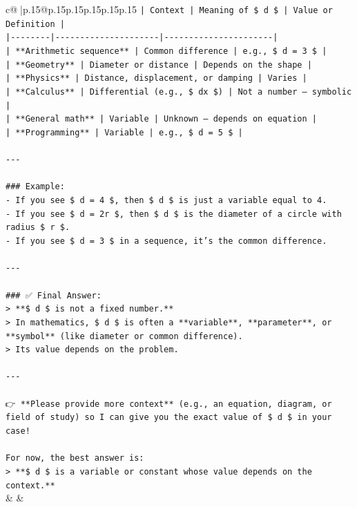 \documentclass{article}
\begin{document}
{\begin{supertabular}{c@{$\;$}|p{.15\linewidth}@{}p{.15\linewidth}p{.15\linewidth}p{.15\linewidth}p{.15\linewidth}p{.15\linewidth}}
{{{\texttt{| Context | Meaning of \$ d \$ | Value or Definition |} \\
\texttt{|{-}{-}{-}{-}{-}{-}{-}{-}|{-}{-}{-}{-}{-}{-}{-}{-}{-}{-}{-}{-}{-}{-}{-}{-}{-}{-}{-}{-}{-}|{-}{-}{-}{-}{-}{-}{-}{-}{-}{-}{-}{-}{-}{-}{-}{-}{-}{-}{-}{-}{-}{-}|} \\
\texttt{| **Arithmetic sequence** | Common difference | e.g., \$ d = 3 \$ |} \\
\texttt{| **Geometry** | Diameter or distance | Depends on the shape |} \\
\texttt{| **Physics** | Distance, displacement, or damping | Varies |} \\
\texttt{| **Calculus** | Differential (e.g., \$ dx \$) | Not a number — symbolic |} \\
\texttt{| **General math** | Variable | Unknown — depends on equation |} \\
\texttt{| **Programming** | Variable | e.g., \$ d = 5 \$ |} \\
\\ 
\texttt{{-}{-}{-}} \\
\\ 
\texttt{\#\#\# Example:} \\
\texttt{{-} If you see \$ d = 4 \$, then \$ d \$ is just a variable equal to 4.} \\
\texttt{{-} If you see \$ d = 2r \$, then \$ d \$ is the diameter of a circle with radius \$ r \$.} \\
\texttt{{-} If you see \$ d = 3 \$ in a sequence, it's the common difference.} \\
\\ 
\texttt{{-}{-}{-}} \\
\\ 
\texttt{\#\#\# ✅ Final Answer:} \\
\texttt{> **\$ d \$ is not a fixed number.**  } \\
\texttt{> In mathematics, \$ d \$ is often a **variable**, **parameter**, or **symbol** (like diameter or common difference).  } \\
\texttt{> Its value depends on the problem.} \\
\\ 
\texttt{{-}{-}{-}} \\
\\ 
\texttt{👉 **Please provide more context** (e.g., an equation, diagram, or field of study) so I can give you the exact value of \$ d \$ in your case!} \\
\\ 
\texttt{For now, the best answer is:} \\
\texttt{> **\$ d \$ is a variable or constant whose value depends on the context.**} \\
            }
        }
    }
    & & \\ \\


\end{supertabular}}
\end{document}

